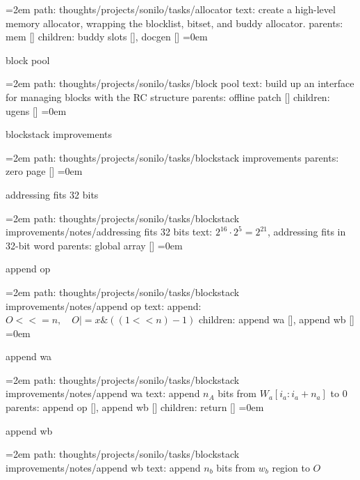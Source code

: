 \leftskip=2em
path: thoughts/projects/sonilo/tasks/allocator
\smallskip
text:  create a high-level memory allocator, wrapping the blocklist, bitset, and buddy allocator.
\smallskip
parents:  mem []
\smallskip
children: buddy slots [], docgen []
\smallskip
\leftskip=0em
\par\endgroup
\bigskip
{}
block pool
\smallskip
\par\begingroup
\leftskip=2em
path: thoughts/projects/sonilo/tasks/block pool
\smallskip
text:  build up an interface for managing blocks with the RC structure
\smallskip
parents:  offline patch []
\smallskip
children: ugens []
\smallskip
\leftskip=0em
\par\endgroup
\bigskip
{}
blockstack improvements
\smallskip
\par\begingroup
\leftskip=2em
path: thoughts/projects/sonilo/tasks/blockstack improvements
\smallskip
parents:  zero page []
\smallskip
\leftskip=0em
\par\endgroup
\bigskip
{}
addressing fits 32 bits
\smallskip
\par\begingroup
\leftskip=2em
path: thoughts/projects/sonilo/tasks/blockstack improvements/notes/addressing fits 32 bits
\smallskip
text:  $2^16 \cdot 2^5 = 2^21$, addressing fits in 32-bit word
\smallskip
parents:  global array []
\smallskip
\leftskip=0em
\par\endgroup
\bigskip
{}
append op
\smallskip
\par\begingroup
\leftskip=2em
path: thoughts/projects/sonilo/tasks/blockstack improvements/notes/append op
\smallskip
text:  append: $O <<= n, \quad O |= x \& ((1 << n) - 1)$
\smallskip
children: append wa [], append wb []
\smallskip
\leftskip=0em
\par\endgroup
\bigskip
{}
append wa
\smallskip
\par\begingroup
\leftskip=2em
path: thoughts/projects/sonilo/tasks/blockstack improvements/notes/append wa
\smallskip
text:  append $n_A$ bits from $W_a[i_a:i_a + n_a]$ to 0
\smallskip
parents:  append op [], append wb []
\smallskip
children: return []
\smallskip
\leftskip=0em
\par\endgroup
\bigskip
{}
append wb
\smallskip
\par\begingroup
\leftskip=2em
path: thoughts/projects/sonilo/tasks/blockstack improvements/notes/append wb
\smallskip
text:  append $n_b$ bits from $w_b$ region to $O$
